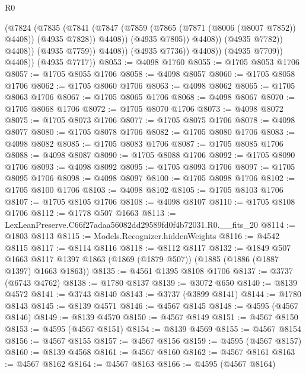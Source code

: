 \begin{lexlean}{R0}
\begin{coremodule}
                                (@7824
                                  (@7835
                                    (@7841
                                      (@7847
                                        (@7859
                                          (@7865 (@7871 (@8006 (@8007 @7852)) @4408))
                                          (@4935 @7828))
                                        @4408))
                                    (@4935 @7805))
                                  @4408))
                              (@4935 @7782))
                            @4408))
                        (@4935 @7759))
                      @4408))
                  (@4935 @7736))
                @4408))
            (@4935 @7709))
          @4408))
      (@4935 @7717))
@8053 := @4098 @1760
@8055 := @1705 @8053 @1706
@8057 := @1705 @8055 @1706
@8058 := @4098 @8057
@8060 := @1705 @8058 @1706
@8062 := @1705 @8060 @1706
@8063 := @4098 @8062
@8065 := @1705 @8063 @1706
@8067 := @1705 @8065 @1706
@8068 := @4098 @8067
@8070 := @1705 @8068 @1706
@8072 := @1705 @8070 @1706
@8073 := @4098 @8072
@8075 := @1705 @8073 @1706
@8077 := @1705 @8075 @1706
@8078 := @4098 @8077
@8080 := @1705 @8078 @1706
@8082 := @1705 @8080 @1706
@8083 := @4098 @8082
@8085 := @1705 @8083 @1706
@8087 := @1705 @8085 @1706
@8088 := @4098 @8087
@8090 := @1705 @8088 @1706
@8092 := @1705 @8090 @1706
@8093 := @4098 @8092
@8095 := @1705 @8093 @1706
@8097 := @1705 @8095 @1706
@8098 := @4098 @8097
@8100 := @1705 @8098 @1706
@8102 := @1705 @8100 @1706
@8103 := @4098 @8102
@8105 := @1705 @8103 @1706
@8107 := @1705 @8105 @1706
@8108 := @4098 @8107
@8110 := @1705 @8108 @1706
@8112 := @1778 @507 @1663
@8113 := LexLeanPreserve.C66f27adaa56082dd29589fd0f4b72031.R0.__fits_20
@8114 := @1803 @8113
@8115 := Models.Recognizer.hiddenWeights
@8116 := @4542 @8115
@8117 := @8114 @8116
@8118 := @8112 @8117
@8132 := @1849
    @507
    @1663
    @8117
    @1397
    @1863
    (@1869 (@1879 @507))
    (@1885 (@1886 (@1887 @1397) @1663 @1863))
@8135 := @4561 @1395 @8108 @1706
@8137 := @3737 (@6743 @4762)
@8138 := @1780 @8137
@8139 := @3072 @650
@8140 := @8139 @4572
@8141 := @3743 @8140
@8143 := @3737 (@3899 @8141)
@8144 := @1780 @8143
@8145 := @8139 @4571
@8146 := @4567 @8145
@8148 := @4595 (@4567 @8146)
@8149 := @8139 @4570
@8150 := @4567 @8149
@8151 := @4567 @8150
@8153 := @4595 (@4567 @8151)
@8154 := @8139 @4569
@8155 := @4567 @8154
@8156 := @4567 @8155
@8157 := @4567 @8156
@8159 := @4595 (@4567 @8157)
@8160 := @8139 @4568
@8161 := @4567 @8160
@8162 := @4567 @8161
@8163 := @4567 @8162
@8164 := @4567 @8163
@8166 := @4595 (@4567 @8164)

\end{coremodule}
\end{lexlean}

